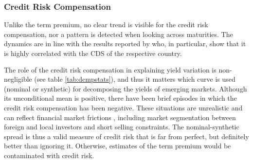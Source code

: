 {\subsubsection{Credit Risk Compensation} \label{sec:CRC}
\iftoggle{toclinks}{\gototoc}{} %

Unlike the term premium, no clear trend is visible for the credit risk compensation, nor a pattern is detected when looking across maturities.
The dynamics are in line with the results reported by \cite{DuSchreger:2016JoF} who, in particular, show that it is highly correlated with the CDS of the respective country.

The role of the credit risk compensation in explaining yield variation is non-negligible (see table \ref{tab:dcmpstats}), and thus it matters which curve is used (nominal or synthetic) for decomposing the yields of emerging markets.
Although its unconditional mean is positive, there have been brief episodes in which the credit risk compensation has been negative.
These situations are unrealistic and can reflect financial market frictions \citep{DuSchreger:2016JoF}, including market segmentation between foreign and local investors and short selling constraints.
The nominal-synthetic spread is thus a valid measure of credit risk that is far from perfect, but
definitely better than ignoring it. 
Otherwise, estimates of the term premium would be contaminated with credit risk. 

}
